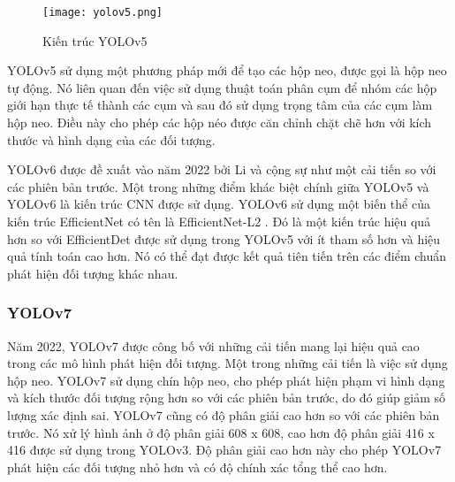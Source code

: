 \documentclass[../the.tex]{subfiles}
\begin{document}
\begin{figure}[H]
	\centering
	\texttt{[image: yolov5.png]}
	\caption{Kiến trúc YOLOv5 \cite{s22020464}}
	\label{fig:yolov5}
\end{figure}

{\fontsize{13}{12} \selectfont

YOLOv5 sử dụng một phương pháp mới để tạo các hộp neo, được gọi là hộp neo tự động.
Nó liên quan đến việc sử dụng thuật toán phân cụm để nhóm các hộp giới hạn thực tế thành các cụm và sau đó sử dụng trọng tâm của các cụm làm hộp neo.
Điều này cho phép các hộp néo được căn chỉnh chặt chẽ hơn với kích thước và hình dạng của các đối tượng.

}

\bigskip

{\fontsize{13}{12} \selectfont

	YOLOv6 \cite{li2022yolov6} được đề xuất vào năm 2022 bởi Li và cộng sự như một cải tiến so với các phiên bản trước.
	Một trong những điểm khác biệt chính giữa YOLOv5 và YOLOv6 là kiến trúc CNN được sử dụng.
	YOLOv6 sử dụng một biến thể của kiến trúc EfficientNet có tên là EfficientNet-L2 \cite{yolov72023}.
	Đó là một kiến trúc hiệu quả hơn so với EfficientDet được sử dụng trong YOLOv5 với ít tham số hơn và hiệu quả tính toán cao hơn. Nó có thể đạt được kết quả tiên tiến trên các điểm chuẩn phát hiện đối tượng khác nhau.

}

\subsubsection{YOLOv7}
\label{sec:yolov7}
{\fontsize{13}{12} \selectfont

	Năm 2022, YOLOv7 \cite{wang2022yolov7} được công bố với những cải tiến mang lại hiệu quả cao trong các mô hình phát hiện đối tượng. Một trong những cải tiến là việc sử dụng hộp neo.
	YOLOv7 sử dụng chín hộp neo, cho phép phát hiện phạm vi hình dạng và kích thước đối tượng rộng hơn so với các phiên bản trước, do đó giúp giảm số lượng xác định sai.
	YOLOv7 cũng có độ phân giải cao hơn so với các phiên bản trước. Nó xử lý hình ảnh ở độ phân giải 608 x 608, cao hơn độ phân giải 416 x 416 được sử dụng trong YOLOv3. Độ phân giải cao hơn này cho phép YOLOv7 phát hiện các đối tượng nhỏ hơn và có độ chính xác tổng thể cao hơn.

}

\bigskip
\end{document}
